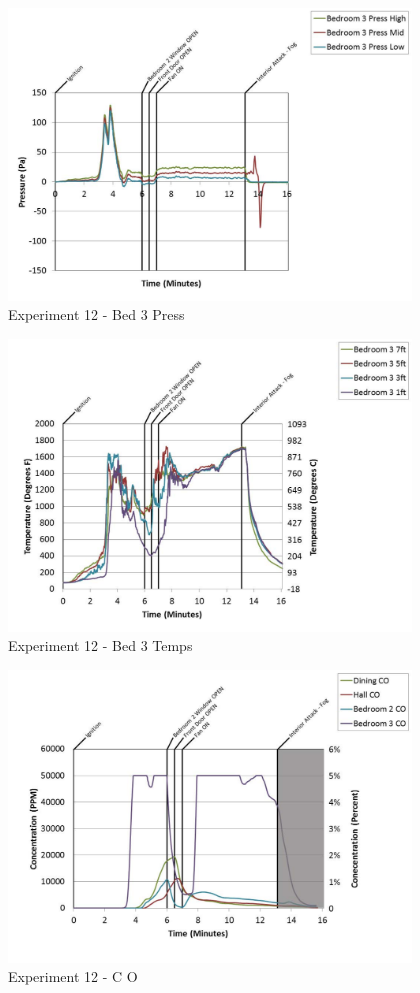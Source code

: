 \documentclass{article}
\begin{document}
\begin{appendices}
	\begin{figure}[h!]
		\centering
		\includegraphics[height=3.05in]{0_Images/Results_Charts/Exp_12_Charts/Bed3Press.pdf}
		\caption{Experiment 12 - Bed 3 Press}
	\end{figure}
 
	\clearpage

	\begin{figure}[h!]
		\centering
		\includegraphics[height=3.05in]{0_Images/Results_Charts/Exp_12_Charts/Bed3Temps.pdf}
		\caption{Experiment 12 - Bed 3 Temps}
	\end{figure}
 

	\begin{figure}[h!]
		\centering
		\includegraphics[height=3.05in]{0_Images/Results_Charts/Exp_12_Charts/CO.pdf}
		\caption{Experiment 12 - C O}
	\end{figure}
 

\end{appendices}
\end{document}
